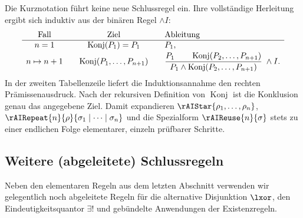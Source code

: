 \documentclass[main.tex]{subfiles}
\begin{document}
\begin{remark}
Die Kurznotation führt keine neue Schlussregel ein. Ihre vollständige
Herleitung ergibt sich induktiv aus der binären Regel \(\land I\):
\[
\begin{array}{c@{\qquad}c@{\qquad}l}
  \text{Fall} & \text{Ziel} & \text{Ableitung} \\
  \hline
  n=1
    & \operatorname{Konj}(P_1)=P_1
    & P_1,\\[2pt]
  n\mapsto n+1
    & \operatorname{Konj}(P_1,\ldots,P_{n+1})
    & \displaystyle
      \frac{P_1\qquad
        \operatorname{Konj}(P_2,\ldots,P_{n+1})}
        {P_1\land\operatorname{Konj}(P_2,\ldots,P_{n+1})}\;\land I.
\end{array}
\]
In der zweiten Tabellenzeile liefert die Induktionsannahme den rechten
Prämissenausdruck. Nach der rekursiven Definition von
\(\operatorname{Konj}\) ist die Konklusion genau das angegebene Ziel.
Damit expandieren \(\rAIStar{\rho_1,\ldots,\rho_n}\),
\(\rAIRepeat{n}{\rho}{\sigma_1\mid\cdots\mid\sigma_n}\) und die
Spezialform \(\rAIReuse{n}{\sigma}\) stets zu einer endlichen Folge
elementarer, einzeln prüfbarer Schritte.
\end{remark}

\subsection{Weitere (abgeleitete) Schlussregeln}

Neben den elementaren Regeln aus dem letzten Abschnitt verwenden wir
gelegentlich noch abgeleitete Regeln für die alternative Disjunktion \(\lxor\),
den Eindeutigkeitsquantor \(\exists!\) und gebündelte Anwendungen der
Existenzregeln.
\end{document}
